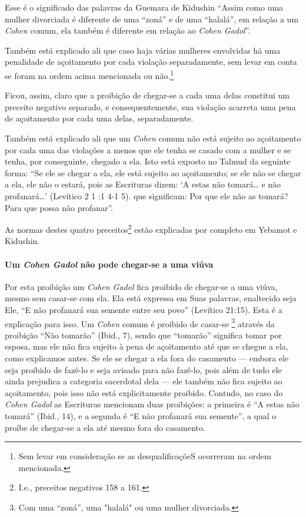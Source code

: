 Esse é o significado das palavras da Guemara de Kidushin ``Assim como
uma mulher divorciada é diferente de uma ``zoná'' e de uma ``halalá'', em
relação a um \textit{Cohen} comum, ela também é diferente em relação ao \textit{Cohen Gadol}''.

Também está explicado ali que caso haja várias mulheres envolvidas há
uma penalidade de açoitamento por cada violação separadamente, sem
levar em conta se foram na ordem acima mencionada ou
não.\footnote{Sem levar em consideração se as desqualificaçõeS ocorreram na ordem
mencionada.}

Ficou, assim, claro que a proibição de chegar-se a cada uma delas
constitui um preceito negativo separado, e consequentemente, sua
violação acarreta uma pena de açoitamento por cada uma delas,
separadamente.

Também está explicado ali que um \textit{Cohen} comum não está sujeito ao
açoitamento por cada uma das violações a menos que ele tenha se casado
com a mulher e se tenha, por conseguinte, chegado a ela. Isto está
exposto no Talmud da seguinte forma: ``Se ele se chegar a ela, ele está
sujeito ao açoitamento; se ele não se chegar a ela, ele não o estará,
pois as Escrituras dizem: `A estas não tomará\ldots{} e não profanará\ldots{}'
(Levítico 2 1 :1 4-1 5). que significam: Por que ele não as tomará? Para
que possa não profanar''.

As normas destes quatro preceitos\footnote{I.e., preceitos negativos 158 a 161.} estão explicadas
por completo em Yebamot e Kidushin.

\paragraph{Um \textit{Cohen Gadol} não pode chegar-se a uma viúva}

Por esta proibição um \textit{Cohen Gadol} fica proibido de chegar-se a uma
viúva, mesmo sem casar-se com ela. Ela está expressa em Suas palavras,
enaltecido seja Ele, ``E não profanará sua semente entre seu povo''
(Levítico 21:15). Esta é a explicação para isso. Um \textit{Cohen} comum é
proibido de casar-se \footnote{Com uma ``zoná'', uma "halalá" ou uma mulher divorciada.} através da proibição ``Não
tomarão'' (Ibid., 7), sendo que ``tomarão'' significa tomar por esposa,
mas ele não fica sujeito à pena de açoitamento até que se chegue a ela,
como explicamos antes. Se ele se chegar a ela fora do casamento ---
embora ele seja proibido de fazê-lo e seja avisado para não fazê-lo,
pois além de tudo ele ainda prejudica a categoria sacerdotal dela ---
ele também não fica sujeito ao açoitamento, pois isso não está
explicitamente proibido. Contudo, no caso do \textit{Cohen Gadol} as
Escrituras mencionam duas proibições: a primeira é ``A estas não
tomará'' (Ibid., 14), e a segunda é ``E não profanará sua semente'', a
qual o proíbe de chegar-se a ela até mesmo fora do casamento.

